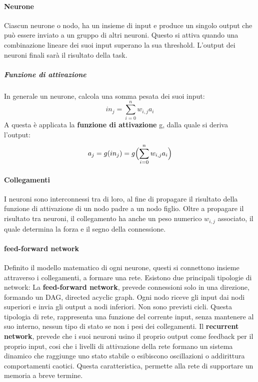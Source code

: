 \documentclass[14pt]{extarticle}
\begin{document}
\paragraph{Neurone}
Ciascun neurone o nodo, ha un insieme di input e produce un singolo output che può essere inviato a un gruppo di altri neuroni. Questo si attiva quando una combinazione lineare dei suoi input superano la sua threshold. L'output dei neuroni finali sarà il risultato della task.
\subparagraph{Funzione di attivazione}
In generale un neurone, calcola una somma pesata dei suoi input:
\[in_j=\sum_{i=0}^n  w_{i,j}a_{i}\]
A questa è applicata la \textbf{funzione di attivazione} g, dalla quale si deriva l'output:
\[a_j=g(in_j)=g \Bigl (\sum_{i=0}^n  w_{i,j}a_{i} \Bigr )\]

\paragraph{Collegamenti}
I neuroni sono interconnessi tra di  loro,  al fine di  propagare il risultato della funzione di attivazione di un nodo padre a un nodo figlio.
Oltre a propagare il risultato tra neuroni, il collegamento ha anche un peso numerico $w_{i,j}$ associato, il quale determina la forza e il segno della connessione.

\paragraph{feed-forward network}
Definito il modello matematico di ogni neurone, questi si connettono insieme attraverso i collegamenti, a formare una rete.
Esistono due principali tipologie di network: 
La \textbf{feed-forward network}, prevede connessioni solo in una direzione, formando un DAG, directed acyclic graph. Ogni nodo riceve gli input dai nodi superiori e invia gli output a nodi inferiori. Non sono previsti cicli. Questa tipologia di rete, rappresenta una funzione del corrente input, senza mantenere al suo interno, nessun tipo di stato se non i pesi dei collegamenti.
Il \textbf{recurrent network}, prevede che i suoi neuroni usino il proprio output come feedback per il proprio input, cosi che i livelli di attivazione della rete formano un sistema dinamico che raggiunge uno stato stabile o
esibiscono oscillazioni o addirittura comportamenti caotici. Questa caratteristica, permette alla rete di supportare un memoria a breve termine.

\end{document}
